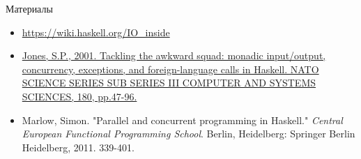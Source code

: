     \begin{frame}[fragile]{Материалы}
        \begin{itemize}
            \item {\color{blue} \url{https://wiki.haskell.org/IO_inside}}
            \item \href{https://citeseerx.ist.psu.edu/document?repid=rep1&type=pdf&doi=2e6c9d76f9cb690dc18019fc894ba9572a8c2812}{\color{blue} Jones, S.P., 2001. Tackling the awkward squad: monadic input/output, concurrency, exceptions, and foreign-language calls in Haskell. NATO SCIENCE SERIES SUB SERIES III COMPUTER AND SYSTEMS SCIENCES, 180, pp.47-96.}
            \item {\color{blue}Marlow, Simon. "Parallel and concurrent programming in Haskell." \textit{Central European Functional Programming School}. Berlin, Heidelberg: Springer Berlin Heidelberg, 2011. 339-401.}
        \end{itemize}
    \end{frame}



